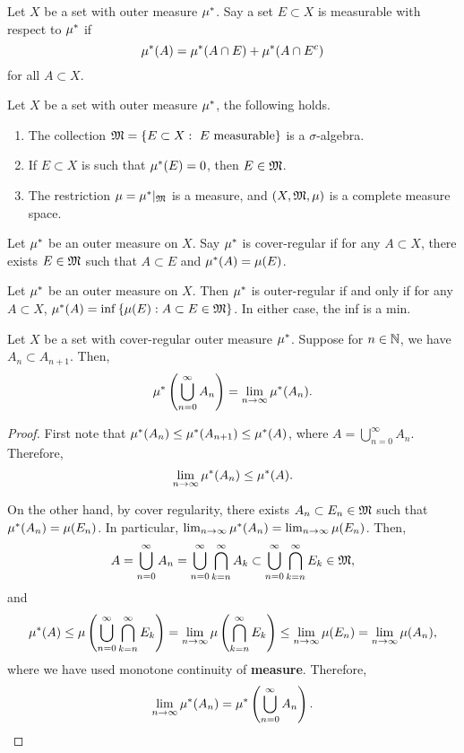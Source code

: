 \documentclass[a4paper]{article}
\renewcommand{\cupinfn}{\bigcup_{n=0}^\infty}
\begin{document}
\begin{defi}
  Let $X$ be a set with outer measure $\mu^*$. Say
  a set $E \subset X$ is measurable with respect to
  $\mu^*$ if
  \[
  \mu^*(A) = \mu^*(A \cap E) + \mu^*(A \cap E^c)
  \]
  for all $A \subset X$.
\end{defi}

\begin{thm}
  Let $X$ be a set with outer measure $\mu^*$, the following
  holds.
  \begin{enumerate}
    \item The collection $\mathfrak{M} = \left\{ E \subset X: \text{
      $E$ measurable} \right\}$
      is a $\sigma$-algebra.
    \item If $E \subset X$ is such that $\mu^*(E) = 0$, then
    $E \in \mathfrak{M}$.
    \item The restriction $\mu = \mu^* \vert_{\mathfrak{M}}$ is a measure,
    and $(X, \mathfrak{M}, \mu)$ is a complete measure space.
  \end{enumerate}
\end{thm}

\begin{defi}
  Let $\mu^*$ be an outer measure on $X$. Say $\mu^*$
  is cover-regular if for any $A \subset X$, there
  exists $E \in \mathfrak{M}$ such that $A \subset E$
  and $\mu^*(A) = \mu(E)$.
\end{defi}

\begin{prop}
  Let $\mu^*$ be an outer measure on $X$. Then $\mu^*$
  is outer-regular if and only if for any $A \subset X$,
  $\mu^*(A) = \inf \left\{ \mu(E) : A \subset E \in
  \mathfrak{M} \right\}$. In either case, the inf is a min.
\end{prop}

\begin{prop}
  Let $X$ be a set with cover-regular outer measure
  $\mu^*$. Suppose for $n \in \mathbb{N}$, we have $A_n \subset
  A_{n+1}$. Then,
  \[
  \om \left( \cupinfn A_n \right)
  = \lim_{n \to \infty} \om(A_n).
  \]
\end{prop}

\begin{proof}
  First note that $\mu^*(A_n) \leq \mu^*(A_{n+1})
  \leq \mu^*(A)$, where $A = \cupinfn A_n$.
  Therefore,
  \[
    \lim_{n \to \infty} \mu^*(A_n) \leq \mu^*(A).
  \]

  On the other hand, by cover regularity, there exists
  $A_n \subset E_n \in \mathfrak{M}$ such that $\mu^*(A_n) = \mu(E_n)$.
  In particular, $\lim_{n \to \infty} \mu^* (A_n)
  = \lim_{n \to \infty} \mu(E_n)$. Then,
  \[
  A = \cupinfn A_n = \cupinfn \bigcap_{k=n}^\infty A_k
  \subset \cupinfn \bigcap_{k=n}^\infty E_k \in \mf,
  \]
  and
  \[
  \begin{aligned}
    \om(A)
    \leq \mu \left( \cupinfn
    \bigcap_{k=n}^\infty E_k \right)
    = \lim_{n \to \infty} \mu \left( \bigcap_{k=n}^\infty
    E_k \right)
    \leq \lim_{n \to \infty} \mu (E_n)
    = \lim_{n \to \infty} \mu(A_n),
  \end{aligned}
  \]
  where we have used monotone continuity of \textbf{measure}.
  Therefore, 
  \[
  \lim_{n \to \infty} \om (A_n) = \om 
  \left( \cupinfn A_n \right).
  \]
\end{proof}
\end{document}
